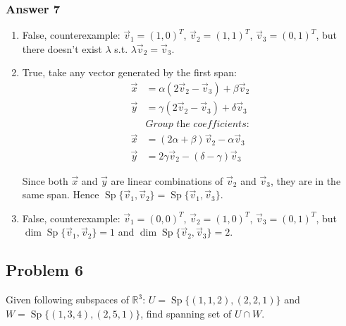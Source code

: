 \documentclass[11pt]{article}
\DeclareMathOperator{\Sp}{Sp}
\begin{document}
\subsubsection{Answer 7}
\label{sec-1-5-1}
\begin{enumerate}
\item False, counterexample: $\vec{v}_1 = (1, 0)^T$, $\vec{v}_2 = (1, 1)^T$,
$\vec{v}_3 = (0, 1)^T$, but there doesn't exist $\lambda$ s.t.
$\lambda \vec{v}_2 = \vec{v}_3$.
\item True, take any vector generated by the first span: 
\begin{align*}
  \vec{x} &= \alpha(2\vec{v}_2 - \vec{v}_3) + \beta \vec{v}_2 \\
  \vec{y} &= \gamma(2\vec{v}_2 - \vec{v}_3) + \delta \vec{v}_3 \\
  &\textit{Group the coefficients: } \\
  \vec{x} &= (2\alpha + \beta) \vec{v}_2 - \alpha \vec{v}_3 \\
  \vec{y} &= 2\gamma \vec{v}_2 - (\delta - \gamma) \vec{v}_3
\end{align*}

Since both $\vec{x}$ and $\vec{y}$ are linear combinations of $\vec{v}_2$
and $\vec{v}_3$, they are in the same span.  Hence $\Sp\{\vec{v}_1,
       \vec{v}_2\} = \Sp\{\vec{v}_1, \vec{v}_3\}$.
\item False, counterexample: $\vec{v}_1 = (0, 0)^T$, $\vec{v}_2 = (1, 0)^T$,
$\vec{v}_3 = (0, 1)^T$, but $\dim\Sp\{\vec{v}_1, \vec{v}_2\} = 1$ and
$\dim\Sp\{\vec{v}_2, \vec{v}_3\} = 2$.
\end{enumerate}

\subsection{Problem 6}
\label{sec-1-6}
Given following subspaces of $\mathbb{R}^3$:
$U = \Sp\{(1,1,2), (2,2,1)\}$ and $W = \Sp\{(1,3,4), (2,5,1)\}$,
find spanning set of $U \cap W$.
\end{document}
